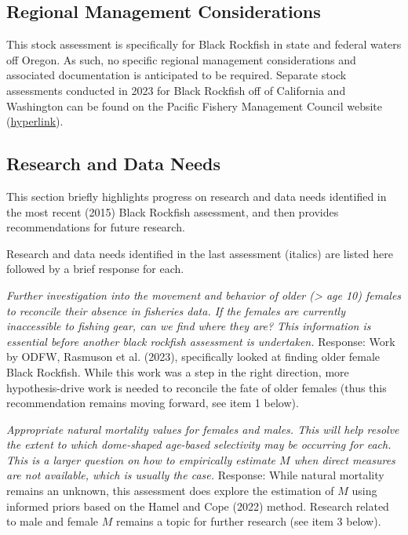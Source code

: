 \documentclass[11pt,
  letterpaper,
]{article}
\begin{document}
\hypertarget{regional-management-considerations}{%
\subsection{Regional Management Considerations}\label{regional-management-considerations}}

This stock assessment is specifically for Black Rockfish in state and federal waters off Oregon. As such, no specific regional management considerations and associated documentation is anticipated to be required. Separate stock assessments conducted in 2023 for Black Rockfish off of California and Washington can be found on the Pacific Fishery Management Council website (\href{https://www.pcouncil.org/stock-assessments-star-reports-stat-reports-rebuilding-analyses-terms-of-reference/groundfish-stock-assessment-documents/}{hyperlink}).

\hypertarget{research-and-data-needs-1}{%
\subsection{Research and Data Needs}\label{research-and-data-needs-1}}

This section briefly highlights progress on research and data needs identified in the most recent (2015) Black Rockfish assessment, and then provides recommendations for future research.

Research and data needs identified in the last assessment (italics) are listed here followed by a brief response for each.

\textit{Further investigation into the movement and behavior of older (> age 10) females to reconcile their absence in fisheries data. If the females are currently inaccessible to fishing gear, can we find where they are? This information is essential before another black rockfish assessment is undertaken.} Response: Work by ODFW, Rasmuson et al. (2023), specifically looked at finding older female Black Rockfish. While this work was a step in the right direction, more hypothesis-drive work is needed to reconcile the fate of older females (thus this recommendation remains moving forward, see item 1 below).

\textit{Appropriate natural mortality values for females and males. This will help resolve the extent to which dome-shaped age-based selectivity may be occurring for each. This is a larger question on how to empirically estimate $M$ when direct measures are not available, which is usually the case.} Response: While natural mortality remains an unknown, this assessment does explore the estimation of \(M\) using informed priors based on the Hamel and Cope (2022) method. Research related to male and female \(M\) remains a topic for further research (see item 3 below).
\end{document}
